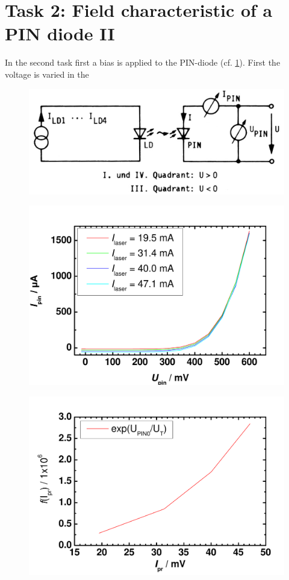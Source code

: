 \section{Task 2: Field characteristic of a PIN diode II}

In the second task first a bias is applied to the PIN-diode (cf. \ref{fig:T2_setup}). First the voltage is varied in the   


\begin{figure}%
\centering
\includegraphics[width=.6\columnwidth]{Grafiken/T2_setup.jpg}%
\caption{}%
\label{fig:T2_setup}%
\end{figure}

\begin{figure}%
\centering
\includegraphics[width=.6\columnwidth]{Grafiken/PIN_kombiniert.pdf}%
\caption{}%
\label{fig:PIN_kombiniert}%
\end{figure}
\begin{figure}%
\centering
\includegraphics[width=.6\columnwidth]{Grafiken/UPIN0.pdf}%
\caption{}%
\label{fig:UPIN0}%
\end{figure}

